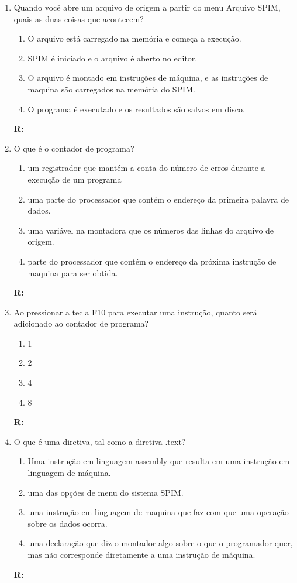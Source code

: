 \documentclass[a4paper,11pt]{article}
\begin{document}
\begin{enumerate}
    \item{Quando você abre um arquivo de origem a partir do menu Arquivo SPIM, quais as duas coisas que 
            acontecem? }
        \begin{enumerate}
            \item{O arquivo está carregado na memória e começa a execução.}
            \item{SPIM é iniciado e o arquivo é aberto no editor.}
            \item{O arquivo é montado em instruções de máquina, e as instruções de maquina são
                    carregados na memória do SPIM.}
            \item{O programa é executado e os resultados são salvos em disco.}
        \end{enumerate}
        \textbf{R: }

    \item{O que é o contador de programa?}
        \begin{enumerate}
            \item{um registrador que mantém a conta do número de erros durante a execução de um
                    programa}
            \item{uma parte do processador que contém o endereço da primeira palavra de dados.}
            \item{uma variável na montadora que os números das linhas do arquivo de origem.}
            \item{parte do processador que contém o endereço da próxima instrução de maquina para ser
                    obtida.}
        \end{enumerate}
        \textbf{R: }

    \item{Ao pressionar a tecla F10 para executar uma instrução, quanto será adicionado ao contador de
            programa?}
        \begin{enumerate}
            \item{1}
            \item{2}
            \item{4}
            \item{8}
        \end{enumerate}
        \textbf{R:}

    \item{O que é uma diretiva, tal como a diretiva .text?}
        \begin{enumerate}
            \item{Uma instrução em linguagem assembly que resulta em uma instrução em linguagem de
                    máquina.}
            \item{uma das opções de menu do sistema SPIM.}
            \item{uma instrução em linguagem de maquina que faz com que uma operação sobre os dados ocorra.}
            \item{uma declaração que diz o montador algo sobre o que o programador quer, mas não
                    corresponde diretamente a uma instrução de máquina.}
        \end{enumerate}
        \textbf{R:}


\end{enumerate}
\end{document}
